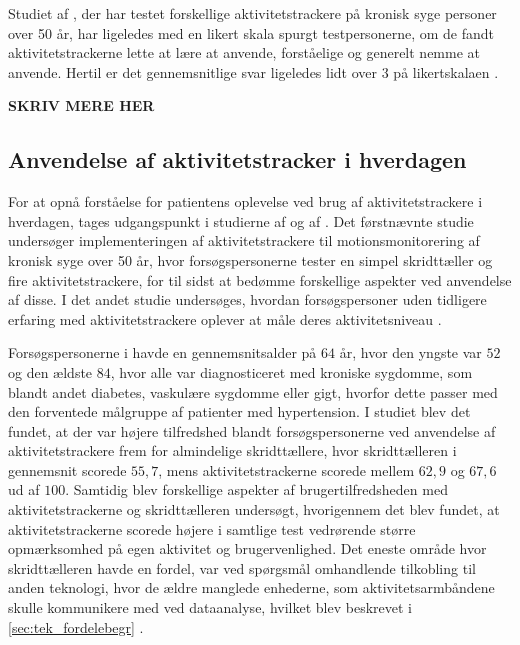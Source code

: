 Studiet af \citeauthor{mercer2016}, der har testet forskellige aktivitetstrackere på kronisk syge personer over 50 år, har ligeledes med en likert skala spurgt testpersonerne, om de fandt aktivitetstrackerne lette at lære at anvende, forståelige og generelt nemme at anvende. Hertil er det gennemsnitlige svar ligeledes lidt over 3 på likertskalaen \citep{mercer2016}. 

\textbf{SKRIV MERE HER}

\subsection{Anvendelse af aktivitetstracker i hverdagen} \label{sec:anvendelse}

For at opnå forståelse for patientens oplevelse ved brug af aktivitetstrackere i hverdagen, tages udgangspunkt i studierne  af \citeauthor{mercer2016} og  af \citeauthor{rapp2016}. Det førstnævnte studie undersøger implementeringen af aktivitetstrackere til motionsmonitorering af kronisk syge over 50 år, hvor forsøgspersonerne tester en simpel skridttæller og fire aktivitetstrackere, for til sidst at bedømme forskellige aspekter ved anvendelse af disse. I det andet studie undersøges, hvordan forsøgspersoner uden tidligere erfaring med aktivitetstrackere oplever at måle deres aktivitetsniveau \citep{mercer2016, rapp2016}.

Forsøgspersonerne i \citeauthor{mercer2016} havde en gennemsnitsalder på $64$ år, hvor den yngste var $52$ og den ældste $84$, hvor alle var diagnosticeret med kroniske sygdomme, som blandt andet diabetes, vaskulære sygdomme eller gigt, hvorfor dette passer med den forventede målgruppe af patienter med hypertension. I studiet blev det fundet, at der var højere tilfredshed blandt forsøgspersonerne ved anvendelse af aktivitetstrackere frem for almindelige skridttællere, hvor skridttælleren i gennemsnit scorede $55,7$, mens aktivitetstrackerne scorede mellem $62,9$ og $67,6$ ud af $100$. Samtidig blev forskellige aspekter af brugertilfredsheden med aktivitetstrackerne og skridttælleren undersøgt, hvorigennem det blev fundet, at aktivitetstrackerne scorede højere i samtlige test vedrørende større opmærksomhed på egen aktivitet og brugervenlighed. Det eneste område hvor skridttælleren havde en fordel, var ved spørgsmål omhandlende tilkobling til anden teknologi, hvor de ældre manglede enhederne, som aktivitetsarmbåndene skulle kommunikere med ved dataanalyse, hvilket blev beskrevet i \autoref{sec:tek_fordelebegr} \citep{mercer2016}.

